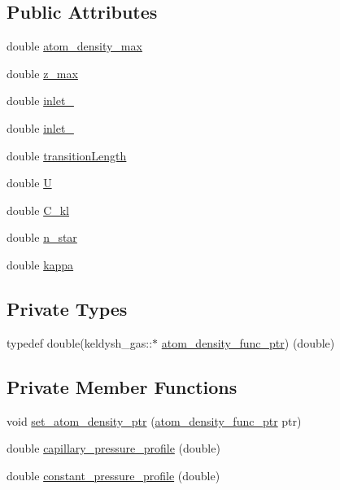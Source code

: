 \subsection*{Public Attributes}
\begin{DoxyCompactItemize}
\item 
double \hyperlink{classkeldysh__gas_a287e2c7a3081d8b65ba126288a3174bd}{atom\+\_\+density\+\_\+max}
\item 
double \hyperlink{classkeldysh__gas_a117691dd8b6fd06b34a73392c0e73e32}{z\+\_\+max}
\item 
double \hyperlink{classkeldysh__gas_ab0dee35b9ad45af3fca4a2079389e632}{inlet\+\_}
\item 
double \hyperlink{classkeldysh__gas_a685d93a796afba55c6fcd6d61c7e2bf8}{inlet\+\_}
\item 
double \hyperlink{classkeldysh__gas_a88f63ff18217c60729a67b10ee838ee4}{transition\+Length}
\item 
double \hyperlink{classkeldysh__gas_a752b70afe289a798cc0ab7b688b9ed3d}{U}
\item 
double \hyperlink{classkeldysh__gas_a7a66e438ff78b240fe419c0a426b1648}{C\+\_\+kl}
\item 
double \hyperlink{classkeldysh__gas_a22ba35c494b37c8a8e78db09d6d8748c}{n\+\_\+star}
\item 
double \hyperlink{classkeldysh__gas_a836c6a6c2f1bec80ea15344822a07ea5}{kappa}
\end{DoxyCompactItemize}
\subsection*{Private Types}
\begin{DoxyCompactItemize}
\item 
typedef double(keldysh\+\_\+gas\+::$\ast$ \hyperlink{classkeldysh__gas_ab47ad59b466eee349a7500555869b988}{atom\+\_\+density\+\_\+func\+\_\+ptr}) (double)
\end{DoxyCompactItemize}
\subsection*{Private Member Functions}
\begin{DoxyCompactItemize}
\item 
void \hyperlink{classkeldysh__gas_a051c59204ad55298d5632ac2eb4dd626}{set\+\_\+atom\+\_\+density\+\_\+ptr} (\hyperlink{classkeldysh__gas_ab47ad59b466eee349a7500555869b988}{atom\+\_\+density\+\_\+func\+\_\+ptr} ptr)
\item 
double \hyperlink{classkeldysh__gas_a9eac2e3d9a39a2358e9b6eb7f4a868c6}{capillary\+\_\+pressure\+\_\+profile} (double)
\item 
double \hyperlink{classkeldysh__gas_ad70cb5ac156d96492a164774b80e7cdc}{constant\+\_\+pressure\+\_\+profile} (double)
\end{DoxyCompactItemize}
